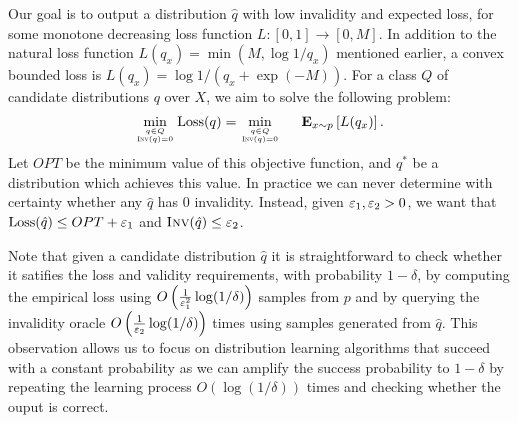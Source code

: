 Our goal is to output a distribution $\hat q$ with low invalidity and expected loss, for some monotone decreasing loss function $L : [0,1] \rightarrow [0,M]$.  In addition to the natural loss function $L(q_x)=\min(M, \log 1/q_x)$ mentioned earlier, a convex bounded loss is $L(q_x)=\log 1/(q_x+\exp(-M))$. 
For a class $Q$ of candidate distributions $q$ over $X$, we aim to solve the following problem:
$$\min_{ q \in Q \atop \Inv(q) = 0 } \Loss(q)=\min_{ q \in Q \atop \Inv(q) = 0 } \Exp_{x \sim p} \left[ L(q_x) \right].$$
Let $OPT$ be the minimum value of this objective function, and $q^*$ be a distribution which achieves this value. In practice we can never determine with certainty whether any $\hat q$ has 0 invalidity. Instead, given $\varepsilon_1, \varepsilon_2 > 0$, we want that $\text{Loss}(\hat q) \le OPT+\varepsilon_1$ and $\textsc{Inv}(\hat q) \le \varepsilon_2$. 


\begin{remark}
  Note that given a candidate distribution $\hat q$ it is straightforward to check whether it satifies the loss and validity requirements, with probability $1-\delta$, by computing the empirical loss using $O\left(\frac 1 {\varepsilon_1^2} \log(1/\delta)\right)$ samples from $p$ and by querying the invalidity oracle $O\left(\frac 1 {\varepsilon_2} \log(1/\delta)\right)$ times using samples generated from $\hat q$. This observation allows us to focus on distribution learning algorithms that succeed with a constant probability as we can amplify the success probability to $1-\delta$ by repeating the learning process $O(\log(1/\delta))$ times and checking whether the ouput is correct. 
\end{remark}
